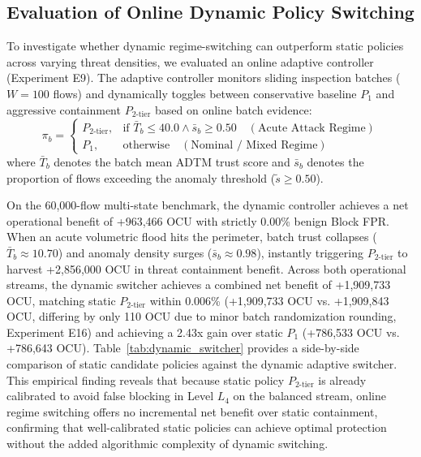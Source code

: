 \documentclass[journal,10pt,onecolumn]{IEEEtran}
\begin{document}
\subsection{Evaluation of Online Dynamic Policy Switching}
To investigate whether dynamic regime-switching can outperform static policies across varying threat densities, we evaluated an online adaptive controller (Experiment E9). The adaptive controller monitors sliding inspection batches ($W=100$ flows) and dynamically toggles between conservative baseline $P_1$ and aggressive containment $P_{2\text{-tier}}$ based on online batch evidence:
$$\pi_b = \begin{cases} P_{2\text{-tier}}, & \text{if } \bar{T}_b \le 40.0 \land \bar{s}_b \ge 0.50 \quad (\text{Acute Attack Regime}) \\ P_1, & \text{otherwise} \quad (\text{Nominal / Mixed Regime}) \end{cases}$$
where $\bar{T}_b$ denotes the batch mean ADTM trust score and $\bar{s}_b$ denotes the proportion of flows exceeding the anomaly threshold ($\tilde{s} \ge 0.50$).

On the 60,000-flow multi-state benchmark, the dynamic controller achieves a net operational benefit of +963,466 OCU with strictly 0.00\% benign Block FPR. When an acute volumetric flood hits the perimeter, batch trust collapses ($\bar{T}_b \approx 10.70$) and anomaly density surges ($\bar{s}_b \approx 0.98$), instantly triggering $P_{2\text{-tier}}$ to harvest +2,856,000 OCU in threat containment benefit. Across both operational streams, the dynamic switcher achieves a combined net benefit of +1,909,733 OCU, matching static $P_{2\text{-tier}}$ within 0.006\% (+1,909,733 OCU vs. +1,909,843 OCU, differing by only 110 OCU due to minor batch randomization rounding, Experiment E16) and achieving a 2.43x gain over static $P_1$ (+786,533 OCU vs. +786,643 OCU). Table~\ref{tab:dynamic_switcher} provides a side-by-side comparison of static candidate policies against the dynamic adaptive switcher. This empirical finding reveals that because static policy $P_{2\text{-tier}}$ is already calibrated to avoid false blocking in Level $L_4$ on the balanced stream, online regime switching offers no incremental net benefit over static containment, confirming that well-calibrated static policies can achieve optimal protection without the added algorithmic complexity of dynamic switching.
\end{document}

